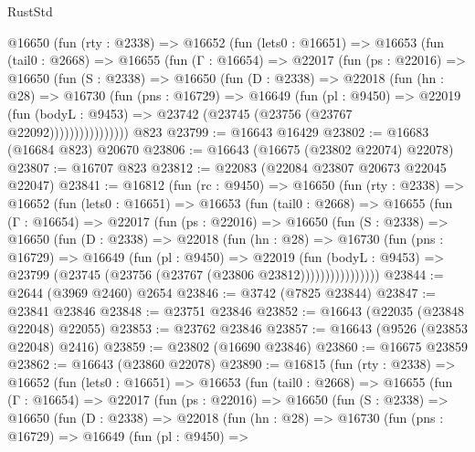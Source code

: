 \begin{lexlean}{RustStd}
\begin{coremodule}
      @16650
        (fun (rty : @2338) =>
        @16652
          (fun (lets0 : @16651) =>
          @16653
            (fun (tail0 : @2668) =>
            @16655
              (fun (Γ : @16654) =>
              @22017
                (fun (ps : @22016) =>
                @16650
                  (fun (S : @2338) =>
                  @16650
                    (fun (D : @2338) =>
                    @22018
                      (fun (hn : @28) =>
                      @16730
                        (fun (pns : @16729) =>
                        @16649
                          (fun (pl : @9450) =>
                          @22019
                            (fun (bodyL : @9453) =>
                            @23742 (@23745 (@23756 (@23767 @22092))))))))))))))))
    @823
@23799 := @16643 @16429
@23802 := @16683 (@16684 @823) @20670
@23806 := @16643 (@16675 (@23802 @22074) @22078)
@23807 := @16707 @823
@23812 := @22083 (@22084 @23807 @20673 @22045 @22047)
@23841 := @16812
    (fun (rc : @9450) =>
    @16650
      (fun (rty : @2338) =>
      @16652
        (fun (lets0 : @16651) =>
        @16653
          (fun (tail0 : @2668) =>
          @16655
            (fun (Γ : @16654) =>
            @22017
              (fun (ps : @22016) =>
              @16650
                (fun (S : @2338) =>
                @16650
                  (fun (D : @2338) =>
                  @22018
                    (fun (hn : @28) =>
                    @16730
                      (fun (pns : @16729) =>
                      @16649
                        (fun (pl : @9450) =>
                        @22019
                          (fun (bodyL : @9453) =>
                          @23799 (@23745 (@23756 (@23767 (@23806 @23812))))))))))))))))
@23844 := @2644 (@3969 @2460) @2654
@23846 := @3742 (@7825 @23844)
@23847 := @23841 @23846
@23848 := @23751 @23846
@23852 := @16643 (@22035 (@23848 @22048) @22055)
@23853 := @23762 @23846
@23857 := @16643 (@9526 (@23853 @22048) @2416)
@23859 := @23802 (@16690 @23846)
@23860 := @16675 @23859
@23862 := @16643 (@23860 @22078)
@23890 := @16815
    (fun (rty : @2338) =>
    @16652
      (fun (lets0 : @16651) =>
      @16653
        (fun (tail0 : @2668) =>
        @16655
          (fun (Γ : @16654) =>
          @22017
            (fun (ps : @22016) =>
            @16650
              (fun (S : @2338) =>
              @16650
                (fun (D : @2338) =>
                @22018
                  (fun (hn : @28) =>
                  @16730
                    (fun (pns : @16729) =>
                    @16649
                      (fun (pl : @9450) =>

\end{coremodule}
\end{lexlean}

